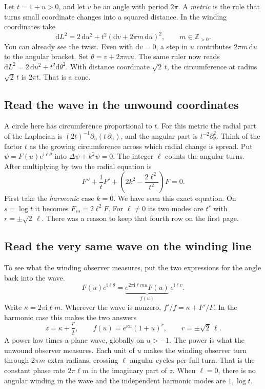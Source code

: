 \documentclass[11pt,a4paper]{amsart}
\newcommand{\dif}{\mathrm{d}}
\newcommand{\ii}{\mathrm{i}}
\theoremstyle{definition}
\theoremstyle{remark}
\begin{document}
Let \(t=1+u>0\), and let \(v\) be an angle with period \(2\pi\). A \emph{metric} is the rule that turns small coordinate changes into a squared distance. In the winding coordinates take
\begin{equation}\label{eq:metric}
 \dif L^2=2\,\dif u^2+t^2(\dif v+2\pi m\,\dif u)^2,\qquad m\in\mathbb Z_{>0}.
\end{equation}
You can already see the twist. Even with \(\dif v=0\), a step in \(u\) contributes \(2\pi m\,\dif u\) to the angular bracket. Set \(\theta=v+2\pi m u\). The same ruler now reads \(\dif L^2=2\,\dif u^2+t^2\dif\theta^2\). With distance coordinate \(\sqrt2\,t\), the circumference at radius \(\sqrt2\,t\) is \(2\pi t\). That is a cone.

\subsection{Read the wave in the unwound coordinates}
A circle here has circumference proportional to \(t\). For this metric the radial part of the Laplacian is \((2t)^{-1}\partial_u(t\,\partial_u)\), and the angular part is \(t^{-2}\partial_\theta^2\). Think of the factor \(t\) as the growing circumference across which radial change is spread. Put \(\psi=F(u)e^{\ii\ell\theta}\) into \(\Delta\psi+k^2\psi=0\). The integer \(\ell\) counts the angular turns. After multiplying by two the radial equation is
\begin{equation}\label{eq:cone}
 F''+\frac{1}{t}F'+\left(2k^2-\frac{2\ell^2}{t^2}\right)F=0.
\end{equation}
First take the \emph{harmonic} case \(k=0\). We have seen this exact equation. On \(s=\log t\) it becomes \(F_{ss}=2\ell^2F\). For \(\ell\ne0\) its two modes are \(t^r\) with \(r=\pm\sqrt2\,\ell\). There was a reason to keep that fourth row on the first page.

\subsection{Read the very same wave on the winding line}
To see what the winding observer measures, put the two expressions for the angle back into the wave.
\[
 F(u)e^{\ii\ell\theta}
   =\underbrace{e^{2\pi\ii\ell m u}F(u)}_{f(u)}\,e^{\ii\ell v}.
\]
Write \(\kappa=2\pi\ii\ell m\). Wherever the wave is nonzero,
\(f'/f=\kappa+F'/F\). In the harmonic case this makes the two answers
\begin{equation}\label{eq:coneans}
 z=\kappa+\frac{r}{t},\qquad
 f(u)=e^{\kappa u}(1+u)^r,\qquad r=\pm\sqrt2\,\ell .
\end{equation}
A power law times a plane wave, globally on \(u>-1\). The power is what the unwound observer measures. Each unit of \(u\) makes the winding observer turn through \(2\pi m\) extra radians, crossing \(\ell\) angular cycles per full turn. That is the constant phase rate \(2\pi\ell m\) in the imaginary part of \(z\). When \(\ell=0\), there is no angular winding in the wave and the independent harmonic modes are \(1,\log t\).
\end{document}
